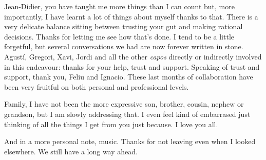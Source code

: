 Jean-Didier, you have taught me more things than I can count but, more importantly, I have learnt a lot of things about myself thanks to that. There is a very delicate balance sitting between trusting your gut and making rational decisions. Thanks for letting me see how that's done. I tend to be a little forgetful, but several conversations we had are now forever written in stone. Agustí, Gregori, Xavi, Jordi and all the other \textit{capos} directly or indirectly involved in this endeavour: thanks for your help, trust and support. Speaking of trust and support, thank you, Feliu and Ignacio. These last months of collaboration have been very fruitful on both personal and professional levels. 

Family, I have not been the more expressive son, brother, cousin, nephew or grandson, but I am slowly addressing that. I even feel kind of embarrased just thinking of all the things I get from you just because. I love you all.

And in a more personal note, music. Thanks for not leaving even when I looked elsewhere. We still have a long way ahead.